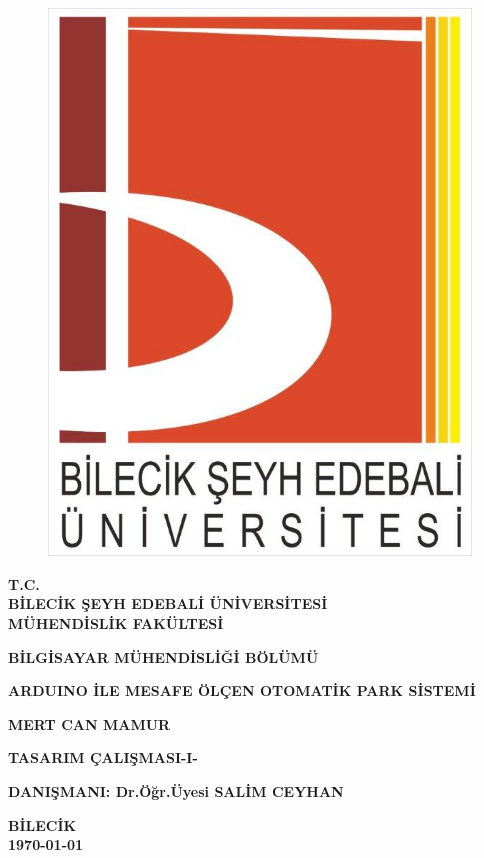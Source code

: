 \thispagestyle{empty} %

\begin{figure}[H]
\centering
\includegraphics[scale=0.2]{logomuz}
\end{figure}
\begin{center}
\textbf{T.C.}\\
\textbf{BİLECİK ŞEYH EDEBALİ ÜNİVERSİTESİ}\\
\textbf{MÜHENDİSLİK FAKÜLTESİ}

\textbf{BİLGİSAYAR MÜHENDİSLİĞİ BÖLÜMÜ}
\end{center}

\vspace*{4cm}
\begin{center}
\textbf{ARDUINO İLE MESAFE ÖLÇEN OTOMATİK PARK SİSTEMİ}

\textbf{MERT CAN MAMUR}

\textbf{TASARIM ÇALIŞMASI-I-}
\end{center}

\vspace*{\fill}
\begin{center}
\textbf{DANIŞMANI: Dr.Öğr.Üyesi SALİM CEYHAN}

\textbf{BİLECİK}\\ 
\textbf{\today}
\end{center}
